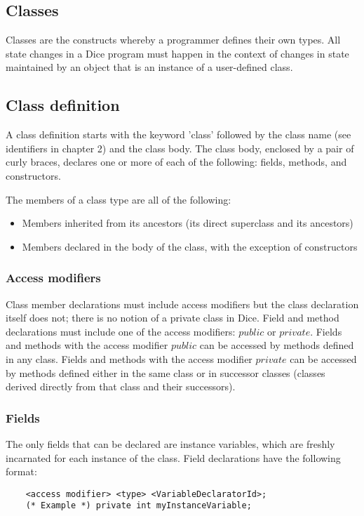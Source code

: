 \begin{homeworkProblem}
	\section{Classes}
	
	Classes are the constructs whereby a programmer defines their own types. All state changes in a Dice program must happen in the context of changes in state maintained by an object that is an instance of a user-defined class.
	
	\subsection{Class definition}
	A class definition starts with the keyword 'class' followed by the class name (see identifiers in chapter 2) and the class body. The class body, enclosed by a pair of curly braces, declares one or more of each of the following: fields, methods, and constructors.
	
	The members of a class type are all of the following:
	\begin{itemize}
		\item Members inherited from its ancestors (its direct superclass and its ancestors)
		\item Members declared in the body of the class, with the exception of constructors
	\end{itemize}
	
	\subsubsection{Access modifiers}
	Class member declarations must include access modifiers but the class declaration itself does not; there is no notion of a private class in Dice. Field and method declarations must include one of the access modifiers: $public$ or $private$. Fields and methods with the access modifier $public$ can be accessed by methods defined in any class. Fields and methods with the access modifier $private$ can be accessed by methods defined either in the same class or in successor classes (classes derived directly from that class and their successors).
	
	\subsubsection{Fields}
	The only fields that can be declared are instance variables, which are freshly incarnated for each instance of the class.
	Field declarations have the following format:
	\begin{verbatim}
	<access modifier> <type> <VariableDeclaratorId>;
	(* Example *) private int myInstanceVariable;
	\end{verbatim}


\end{homeworkProblem}
